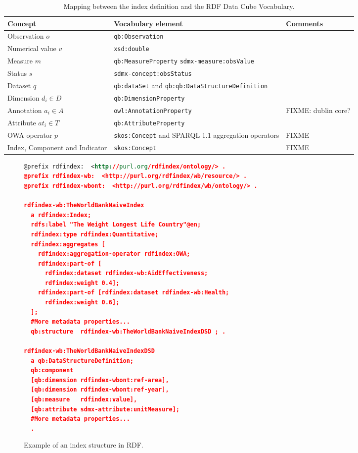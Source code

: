 \begin{table}[!htb]
\renewcommand{\arraystretch}{1.3}
\begin{center}
\begin{tabular}{|p{3cm}||p{6cm}|p{3cm}|}
\hline
  \textbf{Concept} & \textbf{Vocabulary element} &  \textbf{Comments}  \\  \hline
   Observation $o$ & \texttt{qb:Observation} &  \\ \hline
   Numerical value $v$ & \texttt{xsd:double} &  \\ \hline
   Measure $m$ & \texttt{qb:MeasureProperty} \texttt{sdmx-measure:obsValue} &  \\ \hline
   Status $s$ & \texttt{sdmx-concept:obsStatus} &  \\ \hline
   Dataset $q$ & \texttt{qb:dataSet} and \texttt{qb:qb:DataStructureDefinition} &  \\ \hline
   Dimension $d_i \in D$ & \texttt{qb:DimensionProperty} &  \\ \hline
   Annotation $a_i \in A$ & \texttt{owl:AnnotationProperty} &  FIXME: dublin core?\\ \hline
   Attribute $at_i \in T$ & \texttt{qb:AttributeProperty} &  \\ \hline
   OWA operator $p$ &  \texttt{skos:Concept} and SPARQL 1.1 aggregation operators & FIXME \\ \hline
   Index, Component and Indicator & \texttt{skos:Concept} & FIXME \\ \hline
  \hline
  \end{tabular}
  \caption{Mapping between the index definition and the RDF Data Cube Vocabulary.}
  \label{index-to-rdf}
  \end{center}
\end{table} 

\begin{figure}[!ht]
\begin{lstlisting}[language=XML]  
@prefix rdfindex:  <http://purl.org/rdfindex/ontology/> .
@prefix rdfindex-wb:  <http://purl.org/rdfindex/wb/resource/> .
@prefix rdfindex-wbont:  <http://purl.org/rdfindex/wb/ontology/> .

rdfindex-wb:TheWorldBankNaiveIndex 
  a rdfindex:Index;
  rdfs:label "The Weight Longest Life Country"@en;
  rdfindex:type rdfindex:Quantitative;
  rdfindex:aggregates [ 		
    rdfindex:aggregation-operator rdfindex:OWA;
    rdfindex:part-of [
      rdfindex:dataset rdfindex-wb:AidEffectiveness; 
      rdfindex:weight 0.4];
    rdfindex:part-of [rdfindex:dataset rdfindex-wb:Health; 
      rdfindex:weight 0.6];
  ];
  #More metadata properties...
  qb:structure 	rdfindex-wb:TheWorldBankNaiveIndexDSD ; .
  
rdfindex-wb:TheWorldBankNaiveIndexDSD 
  a qb:DataStructureDefinition;  
  qb:component    
  [qb:dimension rdfindex-wbont:ref-area],
  [qb:dimension rdfindex-wbont:ref-year],
  [qb:measure   rdfindex:value],
  [qb:attribute sdmx-attribute:unitMeasure];
  #More metadata properties...
  .
\end{lstlisting}
\caption{Example of an index structure in RDF.}
 \label{fig:results-rdf-index}
\end{figure}

